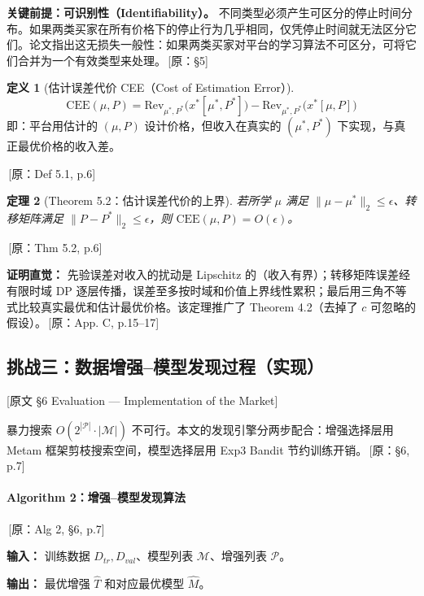\documentclass[12pt,a4paper]{article}
\newcommand{\srcref}[1]{\textcolor{black!65}{\footnotesize\,[原：#1]}}
\newcommand{\secref}[1]{\hspace{0.6em} \textcolor{black!80}{\footnotesize [原文 #1]}}
\newtheorem{theorem}{定理}[section]
\theoremstyle{definition}
\newtheorem{definition}[theorem]{定义}
\begin{document}
\textbf{关键前提：可识别性（Identifiability）。} 不同类型必须产生可区分的停止时间分布。如果两类买家在所有价格下的停止行为几乎相同，仅凭停止时间就无法区分它们。论文指出这无损失一般性：如果两类买家对平台的学习算法不可区分，可将它们合并为一个有效类型来处理。\srcref{§5}

\begin{definition}[估计误差代价 CEE（Cost of Estimation Error）]
\[
\mathrm{CEE}(\mu,P) = \mathrm{Rev}_{\mu^*,P^*}\big(x^*[\mu^*,P^*]\big) - \mathrm{Rev}_{\mu^*,P^*}\big(x^*[\mu,P]\big)
\]
即：平台用估计的 $(\mu,P)$ 设计价格，但收入在真实的 $(\mu^*,P^*)$ 下实现，与真正最优价格的收入差。
\end{definition}
\srcref{Def 5.1, p.6}

\begin{theorem}[Theorem 5.2：估计误差代价的上界]
若所学 $\mu$ 满足 $\|\mu-\mu^*\|_2 \le \epsilon$、转移矩阵满足 $\|P-P^*\|_2 \le \epsilon$，则 $\mathrm{CEE}(\mu,P) = O(\epsilon)$。
\end{theorem}
\srcref{Thm 5.2, p.6}

\textbf{证明直觉：} 先验误差对收入的扰动是 Lipschitz 的（收入有界）；转移矩阵误差经有限时域 DP 逐层传播，误差至多按时域和价值上界线性累积；最后用三角不等式比较真实最优和估计最优价格。该定理推广了 Theorem 4.2（去掉了 $c$ 可忽略的假设）。\srcref{App. C, p.15--17}

\subsection{挑战三：数据增强--模型发现过程（实现）}
\secref{§6 Evaluation — Implementation of the Market}

暴力搜索 $O(2^{|\mathcal{P}|} \cdot |\mathcal{M}|)$ 不可行。本文的发现引擎分两步配合：增强选择层用 Metam 框架剪枝搜索空间，模型选择层用 Exp3 Bandit 节约训练开销。\srcref{§6, p.7}

\paragraph{Algorithm 2：增强--模型发现算法} \srcref{Alg 2, §6, p.7}

\textbf{输入：} 训练数据 $D_{tr},D_{val}$、模型列表 $\mathcal{M}$、增强列表 $\mathcal{P}$。

\textbf{输出：} 最优增强 $\widehat{T}$ 和对应最优模型 $\widehat{M}$。
\end{document}
